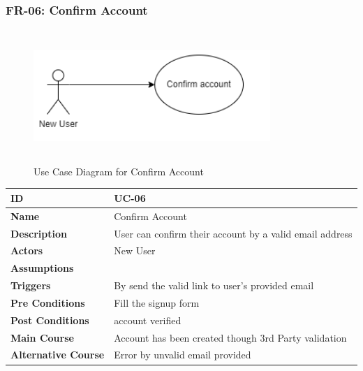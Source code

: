     \subsubsection{FR-06: Confirm Account}
    \begin{figure}[H]
        \includegraphics[height=5cm, width=0.8\textwidth]{./diagrams/Use Case/u6.png}
        \centering 
        \caption{Use Case Diagram for Confirm Account}
        \label{fig:Usecase1}
        \end{figure}
        
    \begin{center}
        \begin{tabularx}{\textwidth}{|l|X|}
            \hline
            \textbf{ID} & UC-06 \\
            \hline
            \textbf{Name} & Confirm Account \\
            \hline
            \textbf{Description} & User can confirm their account by a valid email address \\
            \hline
            \textbf{Actors} & New User \\
            \hline
            \textbf{Assumptions} &  \\
            \hline
            \textbf{Triggers} & By send the valid link to user's provided email \\
            \hline
            \textbf{Pre Conditions} & Fill the signup form \\
            \hline
            \textbf{Post Conditions} & account verified \\
            \hline
            \textbf{Main Course} & Account has been created though 3rd Party validation \\
            \hline
            \textbf{Alternative Course} & Error by unvalid email provided \\
            \hline
            
        \end{tabularx}
    \end{center}
    \newpage
    


